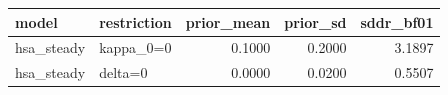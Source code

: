 \begin{tabular}{llrrr}
\toprule
model & restriction & prior\_mean & prior\_sd & sddr\_bf01 \\
\midrule
hsa\_steady & kappa\_0=0 & 0.1000 & 0.2000 & 3.1897 \\
hsa\_steady & delta=0 & 0.0000 & 0.0200 & 0.5507 \\
\bottomrule
\end{tabular}
